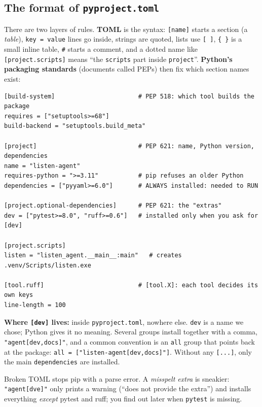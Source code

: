 \documentclass[11pt,a4paper]{article}
\begin{document}
\subsection{The format of \texttt{pyproject.toml}}
There are two layers of rules. \textbf{TOML} is the syntax: \texttt{[name]} starts a section
(a \emph{table}), \texttt{key = value} lines go inside, strings are quoted, lists use
\texttt{[ ]}, \texttt{\{ \}} is a small inline table, \texttt{\#} starts a comment, and a dotted
name like \texttt{[project.scripts]} means ``the \texttt{scripts} part inside \texttt{project}''.
\textbf{Python's packaging standards} (documents called PEPs) then fix which section names exist:
\begin{lstlisting}
[build-system]                       # PEP 518: which tool builds the package
requires = ["setuptools>=68"]
build-backend = "setuptools.build_meta"

[project]                            # PEP 621: name, Python version, dependencies
name = "listen-agent"
requires-python = ">=3.11"           # pip refuses an older Python
dependencies = ["pyyaml>=6.0"]       # ALWAYS installed: needed to RUN

[project.optional-dependencies]      # PEP 621: the "extras"
dev = ["pytest>=8.0", "ruff>=0.6"]   # installed only when you ask for [dev]

[project.scripts]
listen = "listen_agent.__main__:main"   # creates .venv/Scripts/listen.exe

[tool.ruff]                          # [tool.X]: each tool decides its own keys
line-length = 100
\end{lstlisting}

\noindent \textbf{Where \texttt{[dev]} lives:} inside \texttt{pyproject.toml}, nowhere else.
\texttt{dev} is a name we chose; Python gives it no meaning. Several groups install together with
a comma, \texttt{"agent[dev,docs]"}, and a common convention is an \texttt{all} group that points
back at the package: \texttt{all = ["listen-agent[dev,docs]"]}. Without any \texttt{[...]}, only
the main \texttt{dependencies} are installed.

\begin{caution}
Broken TOML stops pip with a parse error. A \emph{misspelt extra} is sneakier:
\texttt{"agent[dve]"} only prints a warning (``does not provide the extra'') and installs
everything \emph{except} pytest and ruff; you find out later when \texttt{pytest} is missing.
\end{caution}
\end{document}
